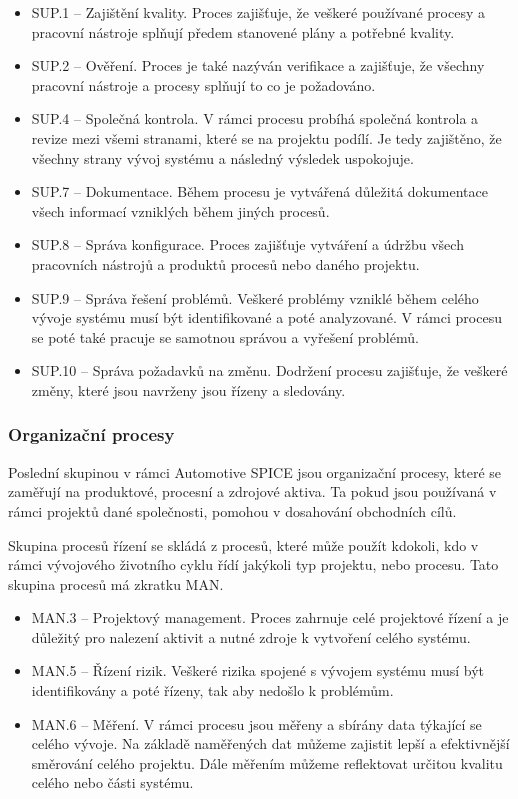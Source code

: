 \documentclass[czech,master,public,dept460,male,cpdeclaration,oneside]{diploma}
\begin{document}
\begin{itemize}
	\item SUP.1 -- Zajištění kvality. Proces zajišťuje, že veškeré používané procesy a pracovní nástroje splňují předem stanovené plány a potřebné kvality.
	\item SUP.2 -- Ověření. Proces je také nazýván verifikace a zajišťuje, že všechny pracovní nástroje a procesy splňují to co je požadováno.
	\item SUP.4 -- Společná kontrola. V rámci procesu probíhá společná kontrola a revize mezi všemi stranami, které se na projektu podílí. Je tedy zajištěno, že všechny strany vývoj systému a následný výsledek uspokojuje.
	\item SUP.7 -- Dokumentace. Během procesu je vytvářená důležitá dokumentace všech informací vzniklých během jiných procesů.
	\item SUP.8 -- Správa konfigurace. Proces zajišťuje vytváření a údržbu všech pracovních nástrojů a produktů procesů nebo daného projektu.
	\item SUP.9 -- Správa řešení problémů. Veškeré problémy vzniklé během celého vývoje systému musí být identifikované a poté analyzované. V rámci procesu se poté také pracuje se samotnou správou a vyřešení problémů. 
	\item SUP.10 -- Správa požadavků na změnu. Dodržení procesu zajišťuje, že veškeré změny, které jsou navrženy jsou řízeny a sledovány.
\end{itemize}

\subsubsection{Organizační procesy}
Poslední skupinou v rámci Automotive SPICE jsou organizační procesy, které se zaměřují na produktové, procesní a zdrojové aktiva. Ta pokud jsou používaná v rámci projektů dané společnosti, pomohou v dosahování obchodních cílů.

Skupina procesů řízení se skládá z procesů, které může použít kdokoli, kdo v rámci vývojového životního cyklu řídí jakýkoli typ projektu, nebo procesu. Tato skupina procesů má zkratku MAN.

\begin{itemize}
	\item MAN.3 -- Projektový management. Proces zahrnuje celé projektové řízení a je důležitý pro nalezení aktivit a nutné zdroje k vytvoření celého systému.
	\item MAN.5 -- Řízení rizik. Veškeré rizika spojené s vývojem systému musí být identifikovány a poté řízeny, tak aby nedošlo k problémům.
	\item MAN.6 -- Měření. V rámci procesu jsou měřeny a sbírány data týkající se celého vývoje. Na základě naměřených dat můžeme zajistit lepší a efektivnější směrování celého projektu. Dále měřením můžeme reflektovat určitou kvalitu celého nebo části systému.
\end{itemize}
\end{document}
